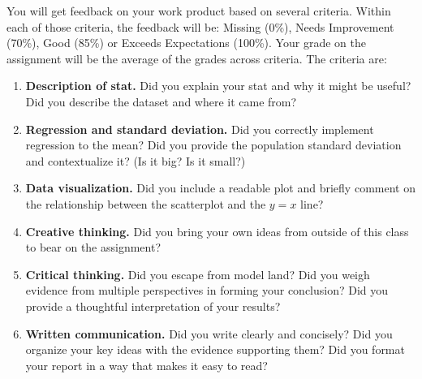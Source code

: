 \documentclass{article}
\begin{document}
      You will get feedback on your work product based on several criteria. Within each of those criteria, the feedback will be: Missing (0\%), Needs Improvement (70\%), Good (85\%) or Exceeds Expectations (100\%). Your grade on the assignment will be the average of the grades across criteria. The criteria are:
      \begin{enumerate}
        \item {\bf Description of stat.} Did you explain your stat and why it might be useful? Did you describe the dataset and where it came from?
        \item {\bf Regression and standard deviation.} Did you correctly implement regression to the mean? Did you provide the population standard deviation and contextualize it? (Is it big? Is it small?)
        \item {\bf Data visualization.} Did you include a readable plot and briefly comment on the relationship between the scatterplot and the $y = x$ line?
        \item {\bf Creative thinking.} Did you bring your own ideas from outside of this class to bear on the assignment?
        \item {\bf Critical thinking.} Did you escape from model land? Did you weigh evidence from multiple perspectives in forming your conclusion? Did you provide a thoughtful interpretation of your results?
        \item {\bf Written communication.} Did you write clearly and concisely? Did you organize your key ideas with the evidence supporting them? Did you format your report in a way that makes it easy to read?
      \end{enumerate}
\end{document}
